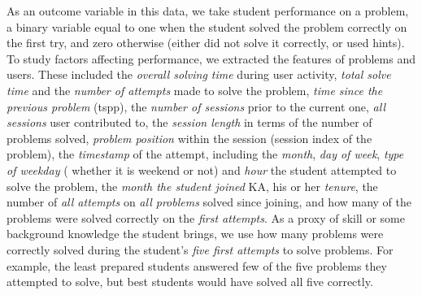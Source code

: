 \documentclass[letterpaper]{article} %
\begin{document}
As an outcome variable in this data, we take student performance on a problem, a binary variable equal to one when the student solved the problem correctly on the first try, and zero otherwise (either did not solve it correctly, or used hints).  To study factors affecting performance, we extracted the features of problems and users. These included the \emph{overall solving time} during user activity, \emph{total solve time} and the \emph{number of attempts} made to solve the problem, \emph{time since the previous problem} (tspp), the \emph{number of sessions} prior to the current one, \emph{all sessions} user contributed to, the \emph{session length} in terms of the number of problems solved, \emph{problem position} within the session (session index of the problem), the \emph{timestamp} of the attempt, including the \emph{month}, \emph{day of week}, \emph{type of weekday} ( whether it is weekend or not) and \emph{hour} the student attempted to solve the problem, the \emph{month the student joined} KA, his or her \emph{tenure}, the number of \emph{all attempts} on \emph{all problems} solved since joining, and how many of the problems were solved correctly on the \emph{first attempts}. As a proxy of skill or some background knowledge the student brings, we use how many problems were correctly solved during the student's \emph{five first attempts} to solve problems. For example, the least prepared students answered few of the five problems they attempted to solve, but best students would have solved all five correctly.
\end{document}
